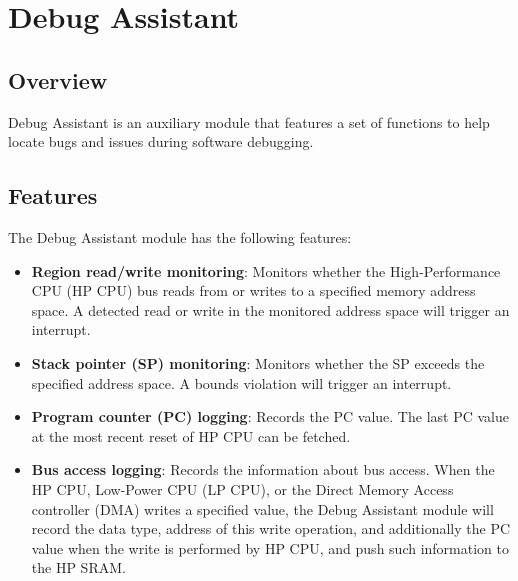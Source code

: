 \documentclass[main\_\_EN.tex]{subfiles}
\begin{document}

\ifglobal
\else
    \listoftodos
    {\let\clearpage\relax \listofdonetodos}
    \tableofcontents
\fi



\chapter{Debug Assistant}
\label{mod:dbgassist}
\hypertarget{dbgassist}{}

\section{Overview}

Debug Assistant is an auxiliary module that features a set of functions to help locate bugs and issues during software debugging.

\section{Features}
\label{sec:dbgassist-features}

The Debug Assistant module has the following features:

\begin{itemize}
    \item \textbf{Region read/write monitoring}: Monitors whether the High-Performance CPU (HP CPU) bus reads from or writes to a specified memory address space. A detected read or write in the monitored address space will trigger an interrupt.
    \item \textbf{Stack pointer (SP) monitoring}: Monitors whether the SP exceeds the specified address space. A bounds violation will trigger an interrupt.
    \item \textbf{Program counter (PC) logging}: Records the PC value. The last PC value at the most recent reset of HP CPU can be fetched.
    \item\textbf{Bus access logging}: Records the information about bus access. When the HP CPU, Low-Power CPU (LP CPU), or the Direct Memory Access controller (DMA) writes a specified value, the Debug Assistant module will record the data type, address of this write operation, and additionally the PC value when the write is performed by HP CPU, and push such information to the HP SRAM.
\end{itemize}
\end{document}
